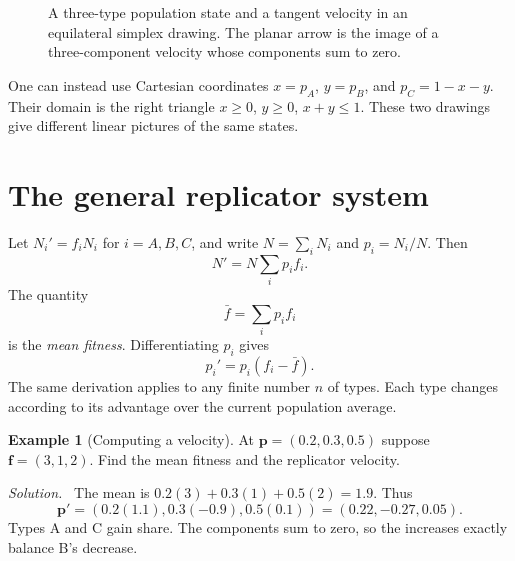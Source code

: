 \documentclass[11pt,oneside,openany]{book}
\theoremstyle{definition}
\newtheorem{example}{Example}[chapter]
\theoremstyle{remark}
\newenvironment{solution}{\par\smallskip\noindent\textit{Solution.}\ }{\par\smallskip}
\newcommand{\p}{\mathbf{p}}
\newcommand{\f}{\mathbf{f}}
\numberwithin{equation}{chapter}
\begin{document}
\begin{figure}[htbp]
\centering
{}
\caption{A three-type population state and a tangent velocity in an equilateral simplex drawing. The planar arrow is the image of a three-component velocity whose components sum to zero.}
\end{figure}

One can instead use Cartesian coordinates $x=p_A$, $y=p_B$, and $p_C=1-x-y$. Their domain is the right triangle $x\geq0$, $y\geq0$, $x+y\leq1$. These two drawings give different linear pictures of the same states.

\section{The general replicator system}
Let $N_i'=f_iN_i$ for $i=A,B,C$, and write $N=\sum_iN_i$ and $p_i=N_i/N$. Then
\[
N'=N\sum_i p_i f_i.
\]
The quantity
\[
\bar f=\sum_i p_i f_i
\]
is the \emph{mean fitness}. Differentiating $p_i$ gives
\begin{equation}\label{eq:generalrep}
\boxed{p_i'=p_i(f_i-\bar f).}
\end{equation}
The same derivation applies to any finite number $n$ of types. Each type changes according to its advantage over the current population average.

\begin{example}[Computing a velocity]
At $\p=(0.2,0.3,0.5)$ suppose $\f=(3,1,2)$. Find the mean fitness and the replicator velocity.
\begin{solution}
The mean is $0.2(3)+0.3(1)+0.5(2)=1.9$. Thus
\[
\p'=(0.2(1.1),0.3(-0.9),0.5(0.1))=(0.22,-0.27,0.05).
\]
Types A and C gain share. The components sum to zero, so the increases exactly balance B's decrease.
\end{solution}
\end{example}
\end{document}

